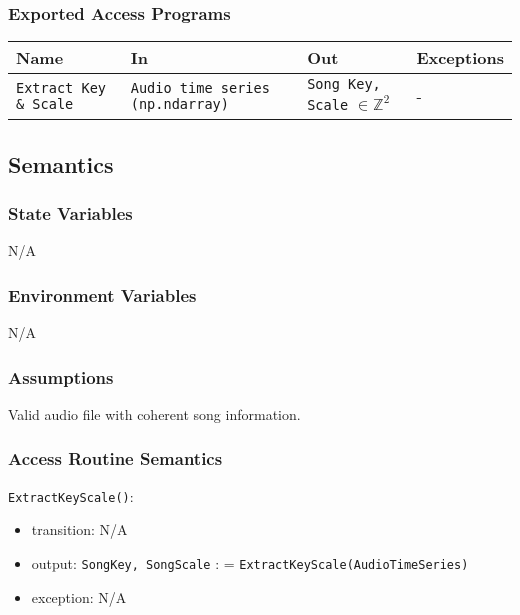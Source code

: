 \documentclass[12pt, titlepage]{article}
\begin{document}
\subsubsection{Exported Access Programs}

\begin{center}
\begin{tabular}{p{2cm} p{4cm} p{4cm} p{2cm}}
\hline
\textbf{Name} & \textbf{In} & \textbf{Out} & \textbf{Exceptions}\\
\hline%
\texttt{Extract Key \& Scale} &\texttt{Audio time series (np.ndarray)} &\texttt{Song Key, Scale} $\in \mathbb{Z}^2$ &-\\
\hline
\end{tabular}
\end{center}

\subsection{Semantics}

\subsubsection{State Variables}
N/A

\subsubsection{Environment Variables}
N/A

\subsubsection{Assumptions}
Valid audio file with coherent song information.

\subsubsection{Access Routine Semantics}

\noindent \texttt{ExtractKeyScale()}:
\begin{itemize}
\item transition: N/A
\item output: \texttt{Song\textunderscore Key, Song\textunderscore Scale} : = \texttt{ExtractKeyScale(Audio\textunderscore Time\textunderscore Series)}
\item exception: N/A
\end{itemize}
\end{document}
